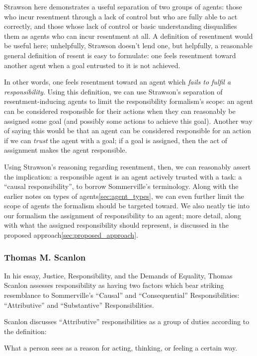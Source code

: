 Strawson here demonstrates a useful separation of two groups of agents: those who incur resentment through a lack of control but who are fully able to act correctly, and those whose lack of control or basic understanding disqualifies them as agents who can incur resentment at all. A definition of resentment would be useful here; unhelpfully, Strawson doesn't lend one, but helpfully, a reasonable general definition of resent is easy to formulate: one feels resentment toward another agent when a goal entrusted to it is not achieved.\par

In other words, one feels resentment toward an agent which \emph{fails to fulfil a responsibility}. Using this definition, we can use Strawson's separation of resentment-inducing agents to limit the responsibility formalism's scope: an agent can be considered responsible for their actions when they can reasonably be assigned some goal (and possibly some actions to achieve this goal). Another way of saying this would be that an agent can be considered responsible for an action if we can \emph{trust} the agent with a goal; if a goal is assigned, then the act of assignment makes the agent responsible.\par

Using Strawson's reasoning regarding resentment, then, we can reasonably assert the implication: a responsible agent is an agent actively trusted with a task: a ``causal responsibility'', to borrow Sommerville's terminology. Along with the earlier notes on types of agents\cref{sec:agent_types}, we can even further limit the scope of agents the formalism should be targeted toward. We also neatly tie into our formalism the assignment of responsibility to an agent; more detail, along with what the assigned responsibility should represent, is discussed in the proposed approach\cref{sec:proposed_approach}.\par

\subsubsection{Thomas M. Scanlon}
In his essay, Justice, Responsibility, and the Demands of Equality\cite{scanlon2006justice}, Thomas Scanlon assesses responsibility as having two factors which bear striking resemblance to Sommerville's ``Causal'' and ``Consequential'' Responsibilities: ``Attributive'' and ``Substantive'' Responsibilities.\par

Scanlon discusses ``Attributive'' responsibilities as a group of duties according to the definition:
\begin{displayquote}
    What a person sees as a reason for acting, thinking, or feeling a certain way.
\end{displayquote}\par

